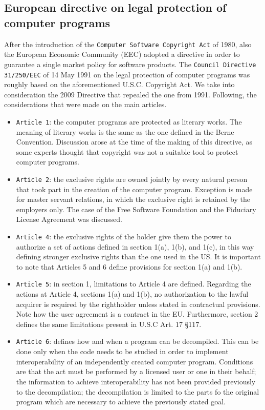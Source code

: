 \subsection*{European directive on legal protection of computer programs}

After the introduction of the \texttt{Computer Software Copyright Act} of 1980, also the European Economic Community (EEC) adopted a directive in order to guarantee a single market policy for software products. The \texttt{Council Directive 31/250/EEC} of 14 May 1991 on the legal protection of computer programs was roughly based on the aforementioned U.S.C. Copyright Act. We take into consideration the 2009 Directive that repealed the one from 1991. Following, the considerations that were made on the main articles.

\begin{itemize}
    \item \texttt{Article 1}: the computer programs are protected as literary works. The meaning of literary works is the same as the one defined in the Berne Convention. Discussion arose at the time of the making of this directive, as some experts thought that copyright was not a suitable tool to protect computer programs.
    \item \texttt{Article 2}: the exclusive rights are owned jointly by every natural person that took part in the creation of the computer program. Exception is made for master servant relations, in which the exclusive right is retained by the employers only. The case of the Free Software Foundation and the Fiduciary License Agreement was discussed.
    \item \texttt{Article 4}: the exclusive rights of the holder give them the power to authorize a set of actions defined in section 1(a), 1(b), and 1(c), in this way defining stronger exclusive rights than the one used in the US. It is important to note that Articles 5 and 6 define provisions for section 1(a) and 1(b).
    \item \texttt{Article 5}: in section 1, limitations to Article 4 are defined. Regarding the actions at Article 4, sections 1(a) and 1(b), no authorization to the lawful acquirer is required by the rightholder unless stated in contractual provisions. Note how the user agreement is a contract in the EU. Furthermore, section 2 defines the same limitations present in U.S.C Art. 17 \S 117.
    \item \texttt{Article 6}: defines how and when a program can be decompiled. This can be done only when the code needs to be studied in order to implement interoperability of an independently created computer program. Conditions are that the act must be performed by a licensed user or one in their behalf; the information to achieve interoperability has not been provided previously to the decompilation; the decompilation is limited to the parts fo the original program which are necessary to achieve the previously stated goal.
\end{itemize}


